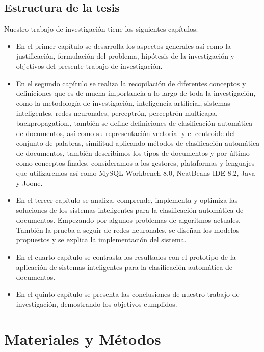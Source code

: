 \section{Estructura de la tesis}

Nuestro trabajo de investigación tiene los siguientes capítulos:

\begin{itemize}
 \item En el primer capítulo se desarrolla los aspectos generales así como la justificación, formulación del problema, hipótesis de la investigación y  objetivos del presente trabajo de investigación.
 \item En el segundo capítulo se realiza la recopilación de diferentes conceptos y definiciones que es de mucha importancia a lo largo de toda la investigación, como la metodología de investigación, inteligencia artificial, sistemas inteligentes, redes neuronales, perceptrón, perceptrón multicapa, backpropagation., también se define definiciones de clasificación automática de documentos, así como su representación vectorial y el centroide del conjunto de palabras, similitud aplicando métodos de clasificación automática de documentos, también describimos los tipos de documentos y por último como conceptos finales, consideramos a los gestores, plataformas y lenguajes que utilizaremos así como MySQL Workbench 8.0, NeatBeans IDE 8.2, Java y Joone.
 \item En el tercer capítulo se analiza, comprende, implementa  y optimiza las soluciones de los sistemas inteligentes para la clasificación automática de documentos. Empezando por algunos problemas de algoritmos actuales. También la prueba a seguir de redes neuronales, se diseñan los modelos propuestos y se explica la implementación del sistema.
 \item En el cuarto capítulo se contrasta los resultados con el prototipo de la aplicación de sistemas inteligentes para la clasificación automática de documentos.
 \item En el quinto capítulo se presenta las conclusiones de nuestro trabajo de investigación, demostrando los objetivos cumplidos.
\end{itemize}




\chapter{Materiales y Métodos}
\renewcommand{\baselinestretch}{2} %

